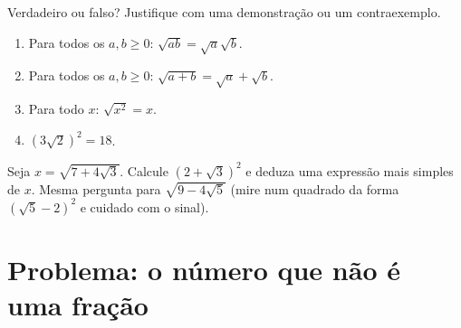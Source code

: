 \begin{exercise}[$\star\star$]\label{exo:g9:sqrt:9}
Verdadeiro ou falso? Justifique com uma demonstração ou um
contraexemplo.
\begin{enumerate}
  \item Para todos os $a, b \geq 0$: $\sqrt{ab} = \sqrt a \sqrt b$.
  \item Para todos os $a, b \geq 0$: $\sqrt{a+b} = \sqrt a + \sqrt b$.
  \item Para todo $x$: $\sqrt{x^2} = x$.
  \item $\left(3\sqrt2\right)^2 = 18$.
\end{enumerate}
\end{exercise}

\begin{exercise}[$\star\star\star$]\label{exo:g9:sqrt:10}
Seja $x = \sqrt{7 + 4\sqrt3}$. Calcule $\left(2 + \sqrt3\right)^2$ e
deduza uma expressão mais simples de $x$. Mesma pergunta para
$\sqrt{9 - 4\sqrt5}$ (mire num quadrado da forma
$\left(\sqrt5 - 2\right)^2$ e cuidado com o sinal).
\end{exercise}

\section{Problema: o número que não é uma fração}

